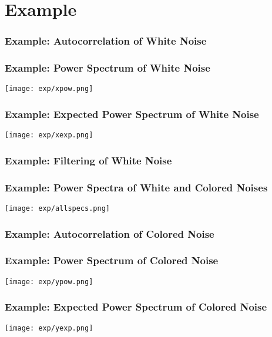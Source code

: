 \documentclass{beamer}
\begin{document}
\section[Example]{Example}
\setcounter{subsection}{1}

\begin{frame}
  \frametitle{Example: Autocorrelation of White Noise}
  
  \centerline{}
\end{frame}

\begin{frame}
  \frametitle{Example: Power Spectrum of White Noise}
  
  \centerline{\texttt{[image: exp/xpow.png]}}
\end{frame}

\begin{frame}
  \frametitle{Example: Expected Power Spectrum of White Noise}
  
  \centerline{\texttt{[image: exp/xexp.png]}}
\end{frame}

\begin{frame}
  \frametitle{Example: Filtering of White Noise}
  
  \centerline{}
\end{frame}

\begin{frame}
  \frametitle{Example: Power Spectra of White and Colored Noises}
  
  \centerline{\texttt{[image: exp/allspecs.png]}}
\end{frame}

\begin{frame}
  \frametitle{Example: Autocorrelation of Colored Noise}
  
  \centerline{}
\end{frame}

\begin{frame}
  \frametitle{Example: Power Spectrum of Colored Noise}
  
  \centerline{\texttt{[image: exp/ypow.png]}}
\end{frame}

\begin{frame}
  \frametitle{Example: Expected Power Spectrum of Colored Noise}
  
  \centerline{\texttt{[image: exp/yexp.png]}}
\end{frame}
\end{document}
